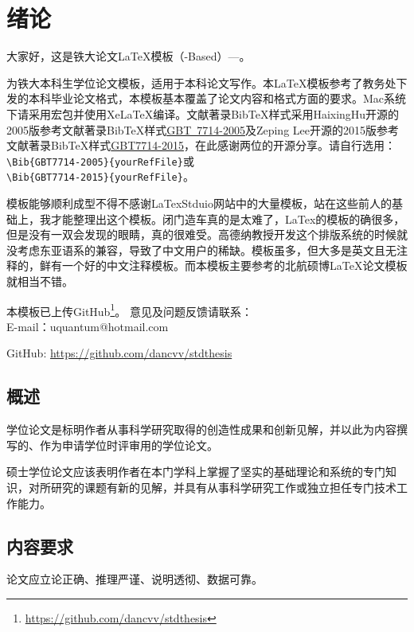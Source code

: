 \chapter{绪论}

大家好，这是铁大论文\LaTeX{}模板（\CTeX{}-Based）---\STDThesis{}。

\STDThesis{}为铁大本科生学位论文模板，适用于本科论文写作。本\LaTeX{}模板参考了教务处下发的本科毕业论文格式，本模板基本覆盖了论文内容和格式方面的要求。Mac系统下请采用宏包并使用XeLaTeX编译。文献著录BibTeX样式采用HaixingHu开源的2005版参考文献著录BibTeX样式\href{https://github.com/Haixing-Hu/GBT7714-2005-BibTeX-Style}{GBT~7714-2005}及Zeping Lee开源的2015版参考文献著录BibTeX样式\href{https://github.com/zepinglee/gbt7714-bibtex-style}{GBT7714-2015}，在此感谢两位的开源分享。请自行选用：\\
\verb|\Bib{GBT7714-2005}{yourRefFile}|或\\
\verb|\Bib{GBT7714-2015}{yourRefFile}|。

模板能够顺利成型不得不感谢LaTexStduio网站中的大量模板，站在这些前人的基础上，我才能整理出这个模板。闭门造车真的是太难了，LaTex的模板的确很多，但是没有一双会发现的眼睛，真的很难受。高德纳教授开发这个排版系统的时候就没考虑东亚语系的兼容，导致了中文用户的稀缺。模板虽多，但大多是英文且无注释的，鲜有一个好的中文注释模板。而本模板主要参考的北航硕博\LaTeX 论文模板就相当不错。

本模板已上传GitHub\footnote{\href{https://github.com/dancvv/stdthesis}{https://github.com/dancvv/stdthesis}}。
意见及问题反馈请联系：\\
\indent E-mail：uquantum@hotmail.com

\indent GitHub: \href{https://github.com/dancvv/stdthesis}{https://github.com/dancvv/stdthesis}
\section{概述}
学位论文是标明作者从事科学研究取得的创造性成果和创新见解，并以此为内容撰写的、作为申请学位时评审用的学位论文。

硕士学位论文应该表明作者在本门学科上掌握了坚实的基础理论和系统的专门知识，对所研究的课题有新的见解，并具有从事科学研究工作或独立担任专门技术工作能力。

\section{内容要求}
论文应立论正确、推理严谨、说明透彻、数据可靠。

